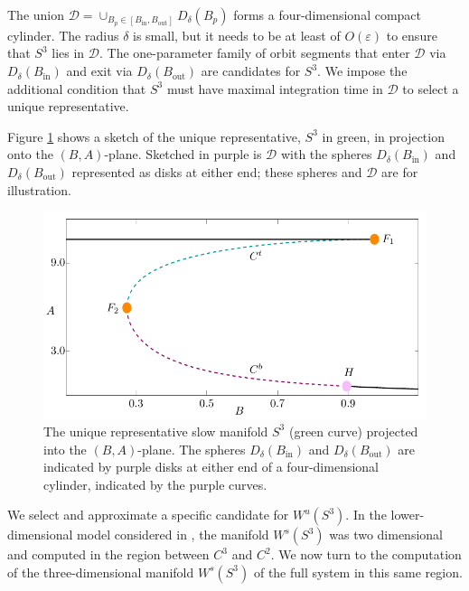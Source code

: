 \documentclass{ws-ijbc}
\begin{document}
\noindent
The union $\mathscr{D} = \cup_{B_p \in [B_{\mathrm{in}}, B_{\mathrm{out}}]} D_\delta(B_p)$ forms a four-dimensional compact cylinder.  The radius $\delta$ is small, but it needs to be at least of $O(\varepsilon)$ to ensure that $S^3$ lies in $\mathscr{D}$.  The one-parameter family of orbit segments that enter $\mathscr{D}$ via $D_\delta(B_{\mathrm{in}})$ and exit via $D_\delta(B_{\mathrm{out}})$ are candidates for $S^3$.   We impose the additional condition that $S^3$ must have maximal integration time in $\mathscr{D}$ to select a unique representative.
    
Figure \ref{tube_figure} shows a sketch of the unique representative, $S^3$ in green, in projection onto the $(B,A)$-plane.  Sketched in purple is $\mathscr{D}$ with the spheres $D_\delta(B_{\mathrm{in}})$ and $D_\delta(B_{\mathrm{out}})$ represented as disks at either end; these spheres and $\mathscr{D}$ are for illustration.

\begin{figure}[!t]
\begin{center}
\includegraphics[page=2]{figures.pdf}
\end{center}
\caption{The unique representative slow manifold $S^3$ (green curve) projected into the $(B,A)$-plane.  The spheres $D_\delta(B_{\mathrm{in}})$ and $D_\delta(B_{\mathrm{out}})$ are indicated by purple disks at either end of a four-dimensional cylinder, indicated by the purple curves.}
\label{tube_figure}
\end{figure}

We select and approximate a specific candidate for $W^u(S^3)$.  In the lower-dimensional model considered in \cite{QSSA}, the manifold $W^s(S^3)$ was two dimensional and computed in the region between $C^3$ and $C^2$.  We now turn to the computation of the three-dimensional manifold $W^s(S^3)$ of the full system in this same region.
\end{document}
